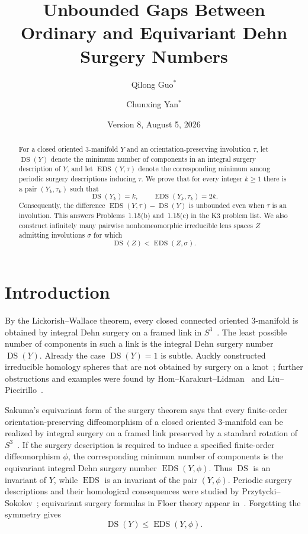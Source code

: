 \documentclass[11pt]{amsart}
\title[Unbounded surgery number gaps]
{Unbounded Gaps Between Ordinary and Equivariant Dehn Surgery Numbers}
\author{Qilong Guo$^{*}$}
\author{Chunxing Yan$^{*}$}
\date{Version 8, August 5, 2026}
\newcommand{\DS}{\operatorname{DS}}
\newcommand{\EDS}{\operatorname{EDS}}
\theoremstyle{definition}
\theoremstyle{remark}
\begin{document}
\begin{abstract}
For a closed oriented $3$-manifold $Y$ and an orientation-preserving involution $\tau$, let $\DS(Y)$ denote the minimum number of components in an integral surgery description of $Y$, and let $\EDS(Y,\tau)$ denote the corresponding minimum among periodic surgery descriptions inducing $\tau$. We prove that for every integer $k\geq 1$ there is a pair $(Y_k,\tau_k)$ such that
\[
   \DS(Y_k)=k,
   \qquad
   \EDS(Y_k,\tau_k)=2k.
\]
Consequently, the difference $\EDS(Y,\tau)-\DS(Y)$ is unbounded even when $\tau$ is an involution. This answers Problems~1.15(b) and~1.15(c) in the K3 problem list. We also construct infinitely many pairwise nonhomeomorphic irreducible lens spaces $Z$ admitting involutions $\sigma$ for which
\[
   \DS(Z)<\EDS(Z,\sigma).
\]
\end{abstract}

\maketitle

\section{Introduction}

By the Lickorish--Wallace theorem, every closed connected oriented $3$-manifold is obtained by integral Dehn surgery on a framed link in $S^3$~\cite{Lickorish,Wallace}. The least possible number of components in such a link is the integral Dehn surgery number $\DS(Y)$. Already the case $\DS(Y)=1$ is subtle. Auckly constructed irreducible homology spheres that are not obtained by surgery on a knot~\cite{Auckly}; further obstructions and examples were found by Hom--Karakurt--Lidman~\cite{HKL} and Liu--Piccirillo~\cite{LP}.

Sakuma's equivariant form of the surgery theorem says that every finite-order orientation-preserving diffeomorphism of a closed oriented $3$-manifold can be realized by integral surgery on a framed link preserved by a standard rotation of $S^3$~\cite{Sakuma}. If the surgery description is required to induce a specified finite-order diffeomorphism $\phi$, the corresponding minimum number of components is the equivariant integral Dehn surgery number $\EDS(Y,\phi)$. Thus $\DS$ is an invariant of $Y$, while $\EDS$ is an invariant of the pair $(Y,\phi)$. Periodic surgery descriptions and their homological consequences were studied by Przytycki--Sokolov~\cite{PS}; equivariant surgery formulas in Floer theory appear in~\cite{Mallick,HMSZ}. Forgetting the symmetry gives
\[
   \DS(Y)\leq \EDS(Y,\phi).
\]
\end{document}
